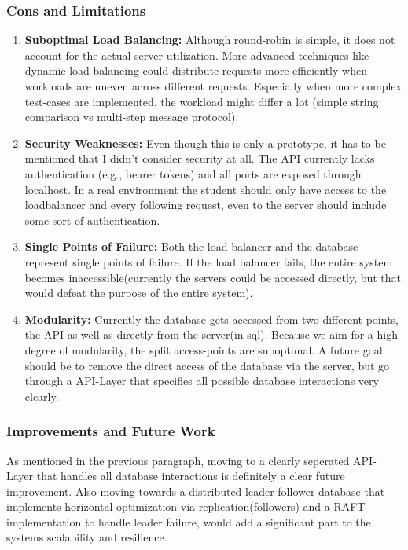 \documentclass{article}
\begin{document}
\subsubsection{Cons and Limitations}
\begin{enumerate}
\item \textbf{Suboptimal Load Balancing:}
Although round-robin is simple, it does not account for the actual server utilization. More advanced techniques like dynamic load balancing could distribute requests more efficiently when workloads are uneven across different requests. Especially when more complex test-cases are implemented, the workload might differ a lot (simple string comparison vs multi-step message protocol).
\item \textbf{Security Weaknesses:}
Even though this is only a prototype, it has to be mentioned that I didn't consider security at all.
The API currently lacks authentication (e.g., bearer tokens) and all ports are exposed through localhost. In a real environment the student should only have access to the loadbalancer and every following request, even to the server should include some sort of authentication.
\item \textbf{Single Points of Failure:}
Both the load balancer and the database represent single points of failure. If the load balancer fails, the entire system becomes inaccessible(currently the servers could be accessed directly, but that would defeat the purpose of the entire system).
\item \textbf{Modularity:}
Currently the database gets accessed from two different points, the API as well as directly from the server(in sql). Because we aim for a high degree of modularity, the split access-points are suboptimal. A future goal should be to remove the direct access of the database via the server, but go through a API-Layer that specifies all possible database interactions very clearly.
\end{enumerate}

\subsubsection{Improvements and Future Work}
As mentioned in the previous paragraph, moving to a clearly seperated API-Layer that handles all database interactions is definitely a clear future improvement.
Also moving towards a distributed leader-follower database that implements horizontal optimization via replication(followers) and a RAFT implementation to handle leader failure, would add a significant part to the systems scalability and resilience. 
\end{document}
